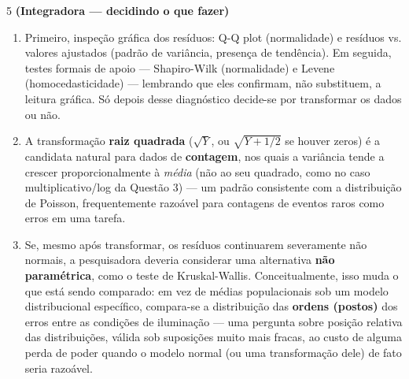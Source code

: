 \documentclass[11pt]{article}
\begin{document}
\begin{questao}{5} \textbf{(Integradora --- decidindo o que fazer)}
\end{questao}
\begin{solucao}
\begin{enumerate}[label=(\alph*)]
  \item Primeiro, inspeção gráfica dos resíduos: Q-Q plot (normalidade) e resíduos vs. valores
    ajustados (padrão de variância, presença de tendência). Em seguida, testes formais de apoio
    --- Shapiro-Wilk (normalidade) e Levene (homocedasticidade) --- lembrando que eles confirmam,
    não substituem, a leitura gráfica. Só depois desse diagnóstico decide-se por transformar os
    dados ou não.
  \item A transformação \textbf{raiz quadrada} ($\sqrt{Y}$, ou $\sqrt{Y+1/2}$ se houver zeros) é a
    candidata natural para dados de \textbf{contagem}, nos quais a variância tende a crescer
    proporcionalmente à \emph{média} (não ao seu quadrado, como no caso multiplicativo/log da
    Questão 3) --- um padrão consistente com a distribuição de Poisson, frequentemente razoável
    para contagens de eventos raros como erros em uma tarefa.
  \item Se, mesmo após transformar, os resíduos continuarem severamente não normais, a
    pesquisadora deveria considerar uma alternativa \textbf{não paramétrica}, como o teste de
    Kruskal-Wallis. Conceitualmente, isso muda o que está sendo comparado: em vez de médias
    populacionais sob um modelo distribucional específico, compara-se a distribuição das
    \textbf{ordens (postos)} dos erros entre as condições de iluminação --- uma pergunta sobre
    posição relativa das distribuições, válida sob suposições muito mais fracas, ao custo de
    alguma perda de poder quando o modelo normal (ou uma transformação dele) de fato seria
    razoável.
\end{enumerate}
\end{solucao}
\end{document}
